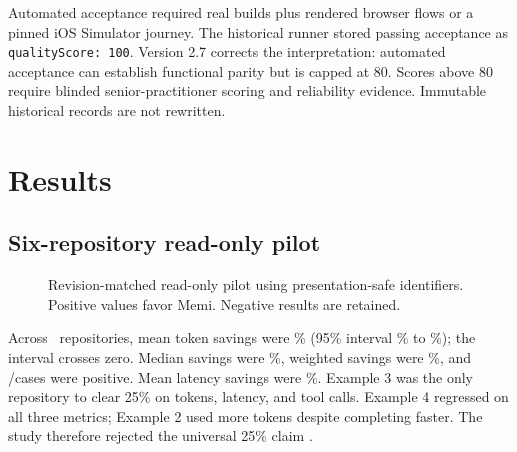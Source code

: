 \documentclass[10pt,twocolumn]{article}
\begin{document}
Automated acceptance required real builds plus rendered browser flows or a
pinned iOS Simulator journey. The historical runner stored passing acceptance
as \texttt{qualityScore: 100}. Version 2.7 corrects the interpretation:
automated acceptance can establish functional parity but is capped at 80.
Scores above 80 require blinded senior-practitioner scoring and reliability
evidence. Immutable historical records are not rewritten.

\section{Results}

\subsection{Six-repository read-only pilot}

\begin{figure}[t]
\centering
{}
\caption{Revision-matched read-only pilot using presentation-safe identifiers.
Positive values favor Memi. Negative results are retained.}
\label{fig:sixrepo}
\end{figure}

Across \SixRepoPairs\ repositories, mean token savings were
\SixRepoMeanTokens\% (95\% interval \SixRepoTokenLower\% to
\SixRepoTokenUpper\%); the interval crosses zero. Median savings were
\SixRepoMedianTokens\%, weighted savings were \SixRepoWeightedTokens\%, and
\SixRepoTokenWins/\SixRepoPairs cases were positive. Mean latency savings were
\SixRepoMeanLatency\%. Example 3 was the only repository to clear 25\% on
tokens, latency, and tool calls. Example 4 regressed on all three metrics;
Example 2 used more tokens despite completing faster. The study therefore
rejected the universal 25\% claim \cite{memi2026sixrepo}.
\end{document}
